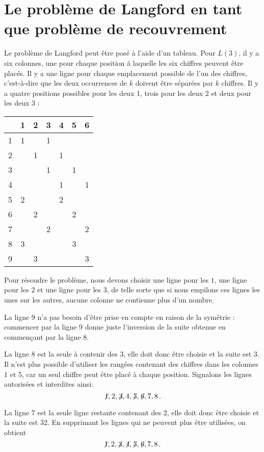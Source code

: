 \section{Le problème de Langford en tant que problème de recouvrement}\label{s.langford-covering}

Le problème de Langford peut être posé à l'aide d'un tableau. Pour $L(3)$, il y a six colonnes, une pour chaque position à laquelle les six chiffres peuvent être placés. Il y a une ligne pour chaque emplacement possible de l'un des chiffres, c'est-à-dire que les deux occurrences de $k$ doivent être séparées par $k$ chiffres. Il y a quatre positions possibles pour les deux   1, trois pour les deux 2 et deux pour les deux 3 :

\begin{center}
\addtolength{\tabcolsep}{4pt}
\begin{tabular}{|c||c|c|c|c|c|c|}
\hline
&1&2&3&4&5&6\\\hline\hline
1&1&&1&&&\\\hline
2&&1&&1&&\\\hline
3&&&1&&1&\\\hline
4&&&&1&&1\\\hline
5&2&&&2&&\\\hline
6&&2&&&2&\\\hline
7&&&2&&&2\\\hline
8&3&&&&3&\\\hline
9&&3&&&&3\\\hline
\end{tabular}
\end{center}
Pour résoudre le problème, nous devons choisir une ligne pour les $1$, une ligne pour les $2$ et une ligne pour les $3$, de telle sorte que si nous empilons ces lignes les unes sur les autres, aucune colonne ne contienne plus d'un nombre.

La ligne 9 n'a pas besoin d'être prise en compte en raison de la symétrie : commencer par la ligne 9 donne juste l'inversion de la suite obtenue en commençant par la ligne 8.

La ligne 8 est la seule à contenir des $3$, elle doit donc être choisie et la suite est 3\textvisiblespace \textvisiblespace {}\textvisiblespace. Il n'est plus possible d'utiliser les rangées contenant des chiffres dans les colonnes 1 et 5, car un seul chiffre peut être placé à chaque position. Signalons les lignes autorisées et interdites ainsi: 
\[\not\! 1,2,\not\! 3,4,\not\! 5, \not\! 6, 7, 8\,.\]

La ligne 7 est la seule ligne restante contenant des $2$, elle doit donc être choisie et la suite est 32. En supprimant les lignes qui ne peuvent plus être utilisées, on obtient 
\[\not\! 1,2,\not\! 3,\not\! 4,\not\! 5, \not\! 6, 7, 8\,.\]


